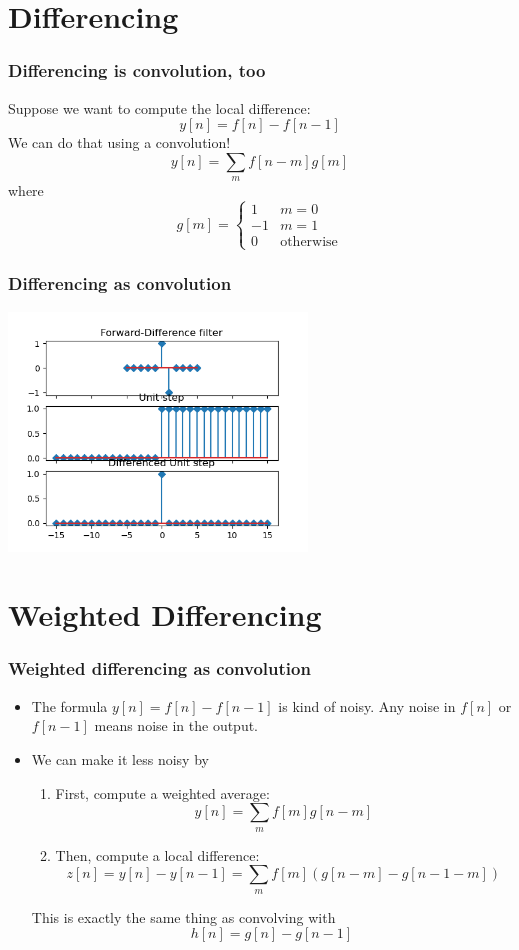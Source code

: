 \documentclass{beamer}
\begin{document}
\section[Differencing]{Differencing}
\setcounter{subsection}{1}

\begin{frame}
  \frametitle{Differencing is convolution, too}

  Suppose we want to compute the local difference:
  \[
  y[n] = f[n] - f[n-1]
  \]
  We can do that using a convolution!
  \[
  y[n] = \sum_m f[n-m]g[m]
  \]
  where
  \[
  g[m] = \begin{cases}
    1 & m=0\\
    -1 & m=1\\
    0 & \mbox{otherwise}
  \end{cases}
  \]
\end{frame}

\begin{frame}
  \frametitle{Differencing as convolution} 
  \centerline{\includegraphics[height=2.5in]{mp1fig5.png}}
\end{frame}
  
\section[Weighted]{Weighted Differencing}
\setcounter{subsection}{1}

\begin{frame}
  \frametitle{Weighted differencing as convolution}
  \begin{itemize}
    \item 
      The formula $y[n]=f[n]-f[n-1]$ is kind of noisy.  Any noise in
      $f[n]$ or $f[n-1]$ means noise in the output.
    \item
      We can make it less noisy  by
      \begin{enumerate}
      \item First, compute a weighted average:
        \[
        y[n] = \sum_m f[m]g[n-m]
        \]
      \item Then, compute a local difference:
        \[
        z[n] = y[n] - y[n-1] = \sum_m f[m]\left(g[n-m]-g[n-1-m]\right)
        \]
      \end{enumerate}
      This is exactly the same thing as convolving with
      \[
      h[n] = g[n]-g[n-1]
      \]
  \end{itemize}
\end{frame}
\end{document}
